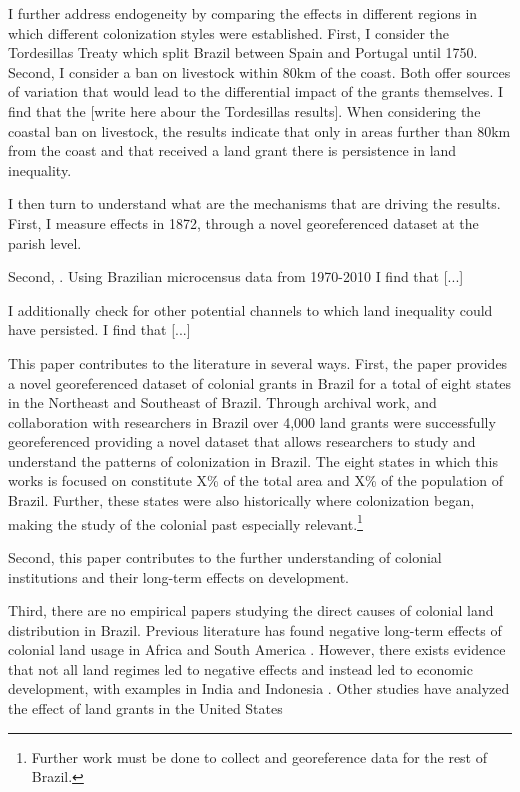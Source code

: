 \documentclass{article}
\begin{document}
I further address endogeneity by comparing the effects in different regions in which different colonization styles were established.
First, I consider the Tordesillas Treaty which split Brazil between Spain and Portugal until 1750. 
Second, I consider a ban on livestock within 80km of the coast.
Both offer sources of variation that would lead to the differential impact of the grants themselves.
I find that the [write here abour the Tordesillas results].
When considering the coastal ban on livestock, the results indicate that only in areas further than 80km from the coast and that received a land grant there is persistence in land inequality.


I then turn to understand what are the mechanisms that are driving the results. 
First, I measure effects in 1872, through a novel georeferenced dataset at the parish level. 

Second, .
Using Brazilian microcensus data from 1970-2010 I find that [...]

I additionally check for other potential channels to which land inequality could have persisted. 
I find that [...]

This paper contributes to the literature in several ways. 
First, the paper provides a novel georeferenced dataset of colonial grants in Brazil for a total of eight states in the Northeast and Southeast of Brazil.
Through archival work, and collaboration with researchers in Brazil over 4,000 land grants were successfully georeferenced providing a novel dataset that allows researchers to study and understand the patterns of colonization in Brazil.
The eight states in which this works is focused on constitute X\% of the total area and X\% of the population of Brazil.
Further, these states were also historically where colonization began, making the study of the colonial past especially relevant.\footnote{Further work must be done to collect and georeference data for the rest of Brazil.}

Second, this paper contributes to the further understanding of colonial institutions and their long-term effects on development. \parencite{Acemoglu2005-ti}

Third, there are no empirical papers studying the direct causes of colonial land distribution in Brazil. 
Previous literature has found negative long-term effects of colonial land usage in Africa and South America \parencites{Dell2010-qt}{Lowes2021-ww}. 
However, there exists evidence that not all land regimes led to negative effects and instead led to economic development, with examples in India and Indonesia \parencites{Banerjee2005-ki}{Dell2019-np}{Ratnoo2023-vw}.  
Other studies have analyzed the effect of land grants in the United States \parencites{Akee2014-uw}{Allen2019-kh}{Smith2023-ip}
\end{document}
